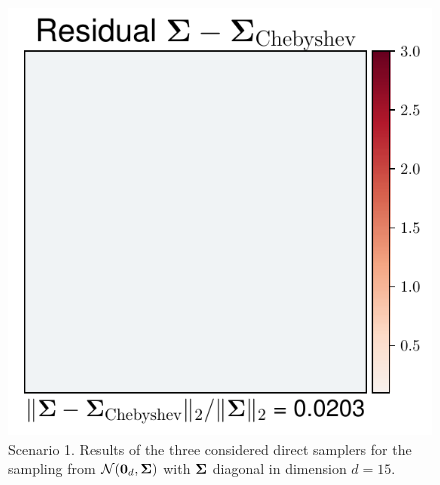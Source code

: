 \documentclass[nohypdvips,onefignum,onetabnum]{siamart171218}
\begin{document}
\begin{figure}
  \mbox{{\includegraphics[scale=0.4]{images/simu1_ex2_A_Cheby.pdf}}}
\caption{Scenario 1. Results of the three considered direct samplers for the sampling from $\mathcal{N}(\mathbf{0}_d,\mathbf{\Sigma})$ with $\mathbf{\Sigma}$ diagonal in dimension $d = 15$.}
  \label{fig:simu2}
\end{figure}
\end{document}
